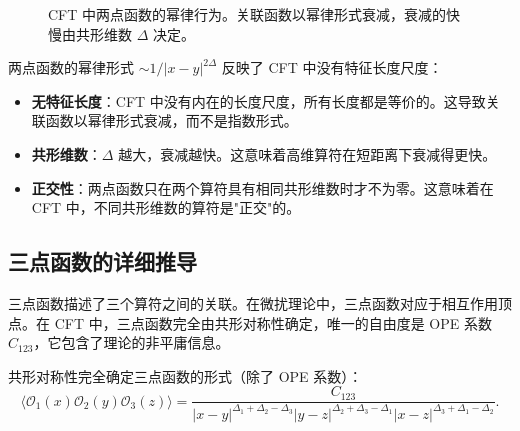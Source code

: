 \begin{figure}[htbp]
\centering
{}
\caption{CFT 中两点函数的幂律行为。关联函数以幂律形式衰减，衰减的快慢由共形维数 $\Delta$ 决定。}
\label{fig:two_point}
\end{figure}

\begin{note}[两点函数的物理意义]
两点函数的幂律形式 $\sim 1/|x-y|^{2\Delta}$ 反映了 CFT 中没有特征长度尺度：
\begin{itemize}
    \item \textbf{无特征长度}：CFT 中没有内在的长度尺度，所有长度都是等价的。这导致关联函数以幂律形式衰减，而不是指数形式。
    \item \textbf{共形维数}：$\Delta$ 越大，衰减越快。这意味着高维算符在短距离下衰减得更快。
    \item \textbf{正交性}：两点函数只在两个算符具有相同共形维数时才不为零。这意味着在 CFT 中，不同共形维数的算符是"正交"的。
\end{itemize}
\end{note}

\subsection{三点函数的详细推导}

\begin{note}[物理动机]
三点函数描述了三个算符之间的关联。在微扰理论中，三点函数对应于相互作用顶点。在 CFT 中，三点函数完全由共形对称性确定，唯一的自由度是 OPE 系数 $C_{123}$，它包含了理论的非平庸信息。
\end{note}

\begin{theorem}[三点函数的形式]
共形对称性完全确定三点函数的形式（除了 OPE 系数）：
\begin{equation}
    \langle \mathcal{O}_1(x) \mathcal{O}_2(y) \mathcal{O}_3(z) \rangle = \frac{C_{123}}{|x - y|^{\Delta_1 + \Delta_2 - \Delta_3} |y - z|^{\Delta_2 + \Delta_3 - \Delta_1} |x - z|^{\Delta_3 + \Delta_1 - \Delta_2}}.
\end{equation}
\end{theorem}

